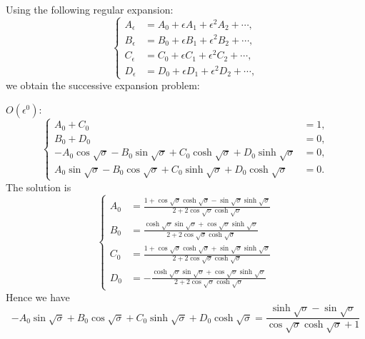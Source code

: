 \documentclass{article}
\begin{document}
Using the following regular expansion:
\begin{equation}
    \left\{\begin{aligned}
        A_\epsilon &= A_0 + \epsilon A_1 + \epsilon^2 A_2 + \cdots, \\
        B_\epsilon &= B_0 + \epsilon B_1 + \epsilon^2 B_2 + \cdots, \\
        C_\epsilon &= C_0 + \epsilon C_1 + \epsilon^2 C_2 + \cdots, \\
        D_\epsilon &= D_0 + \epsilon D_1 + \epsilon^2 D_2 + \cdots, 
    \end{aligned}\right.
\end{equation}
we obtain the successive expansion problem:

\noindent
$O(\epsilon^0)$:
\begin{equation}
    \left\{\begin{aligned}
        A_0 + C_0 &= 1, \\
        B_0 + D_0 &= 0, \\
        - A_0 \cos{\sqrt{\sigma}} - B_0 \sin{\sqrt{\sigma}} + C_0 \cosh{\sqrt{\sigma}} + D_0 \sinh{\sqrt{\sigma}} &= 0, \\
        A_0 \sin{\sqrt{\sigma}} - B_0 \cos{\sqrt{\sigma}} + C_0 \sinh{\sqrt{\sigma}} + D_0 \cosh{\sqrt{\sigma}} &= 0.
    \end{aligned}\right.
\end{equation}
The solution is
\begin{equation}
    \left\{\begin{aligned}
        A_0 &= \frac{1 + \cos\sqrt{\sigma} \cosh\sqrt{\sigma} - \sin\sqrt{\sigma} \sinh\sqrt{\sigma} }{2 + 2 \cos\sqrt{\sigma} \cosh\sqrt{\sigma} } \\
        B_0 &= \frac{\cosh\sqrt{\sigma} \sin\sqrt{\sigma} + \cos\sqrt{\sigma} \sinh\sqrt{\sigma} }{2 + 2 \cos\sqrt{\sigma} \cosh\sqrt{\sigma} } \\
        C_0 &= \frac{1 + \cos\sqrt{\sigma} \cosh\sqrt{\sigma} + \sin\sqrt{\sigma} \sinh\sqrt{\sigma} }{2 + 2 \cos\sqrt{\sigma} \cosh\sqrt{\sigma} } \\
        D_0 &= -\frac{\cosh\sqrt{\sigma} \sin\sqrt{\sigma} + \cos\sqrt{\sigma} \sinh\sqrt{\sigma} }{2 + 2 \cos\sqrt{\sigma} \cosh\sqrt{\sigma} }
    \end{aligned}\right.
\end{equation}
Hence we have
\begin{equation}
    - A_0 \sin{\sqrt{\sigma}} + B_0 \cos{\sqrt{\sigma}} + C_0 \sinh{\sqrt{\sigma}} + D_0 \cosh{\sqrt{\sigma}} = \frac{\sinh\sqrt{\sigma }-\sin\sqrt{\sigma }}{\cos\sqrt{\sigma } \cosh\sqrt{\sigma }+1}
\end{equation}
\end{document}
